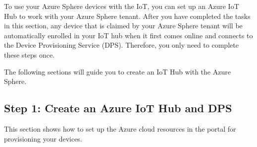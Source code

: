 To use your Azure Sphere devices with the IoT, you can set up an Azure IoT Hub to work with your Azure Sphere tenant. After you have completed the tasks in this section, any device that is claimed by your Azure Sphere tenant will be automatically enrolled in your IoT hub when it first comes online and connects to the Device Provisioning Service (DPS). Therefore, you only need to complete these steps once.

The following sections will guide you to create an IoT Hub with the Azure Sphere.

\subsection{Step 1: Create an Azure IoT Hub and DPS}
\label{subsec:Step1}
This section shows how to set up the Azure cloud resources in the portal for provisioning your devices.


